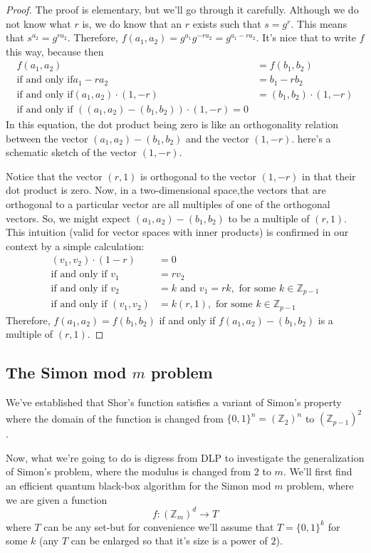 \begin{proof}
    The proof is elementary, but we'll go through it carefully. Although we do not know what $r$ is, we do know that an $r$ exists such that $s=g^r$. This means that $s^{a_2}=g^{ra_2}$. Therefore, $f(a_1,a_2)=g^{a_1}g^{-ra_2}=g^{a_1-ra_2}$. It's nice that to write $f$ this way, because then
    \begin{align*}
    f(a_1,a_2)&=f(b_1,b_2)\\
    \text{if and only if} a_1-ra_2&=b_1-rb_2\\
    \text{if and only if} (a_1,a_2)\cdot(1,-r)&=(b_1,b_2)\cdot(1,-r)\\
    \text{if and only if }((a_1,a_2)-(b_1,b_2))\cdot(1,-r)=0
    \end{align*}
    In this equation, the dot product being zero is like an orthogonality relation between the vector $(a_1,a_2)-(b_1,b_2)$ and the vector $(1,-r)$. here's a schematic sketch of the vector $(1,-r)$.

    Notice that the vector $(r,1)$ is orthogonal to the vector $(1,-r)$ in that their dot product is zero. Now, in a two-dimensional space,the vectors that are orthogonal to a particular vector are all multiples of one of the orthogonal vectors. So, we might expect $(a_1,a_2)-(b_1,b_2)$ to be a multiple of $(r,1)$. This intuition (valid for vector spaces with inner products) is confirmed in our context by a simple calculation:
    \begin{align*}
        (v_1,v_2)\cdot(1-r)&=0\\
        \text{if and only if } v_1&=rv_2\\
        \text{if and only if } v_2&=k \text{ and } v_1=rk, \text{ for some $k\in \mathbb{Z}_{p-1}$}\\
        \text{if and only if } (v_1,v_2)&=k(r,1), \text{ for some $k\in \mathbb{Z}_{p-1}$}
    \end{align*}
    Therefore, $f(a_1,a_2)=f(b_1,b_2)$ if and only if $f(a_1,a_2)-(b_1,b_2)$ is a multiple of $(r,1)$.
\end{proof}
\subsection{The Simon mod $m$ problem}
We've established that Shor's function satisfies a variant of Simon's property where the domain of the function is changed from $\{0,1\}^n=(\mathbb{Z}_2)^n$ to $(\mathbb{Z}_{p-1})^2$.

Now, what we're going to do is digress from DLP to investigate the generalization of Simon's problem, where the modulus is changed from $2$ to $m$. We'll first find an efficient quantum black-box algorithm for the Simon mod $m$ problem, where we are given a function
\[
f:(\mathbb{Z}_m)^d \rightarrow T
\]
where $T$ can be any set-but for convenience we'll assume that $T=\{0,1\}^k$ for some $k$ (any $T$ can be enlarged so that it's size is a power of $2$).

